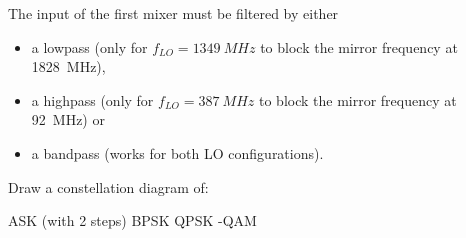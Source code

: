 \begin{solution}
\begin{tasks}
		The input of the first mixer must be filtered by either
		\begin{itemize}
			\item a lowpass (only for $f_{LO} = \SI{1349}{MHz}$ to block the mirror frequency at \SI{1828}{MHz}),
			\item a highpass (only for $f_{LO} = \SI{387}{MHz}$ to block the mirror frequency at \SI{92}{MHz}) or
			\item a bandpass (works for both LO configurations).
		\end{itemize}
	\end{tasks}
\end{solution}

\begin{question}[subtitle={Constellation diagrams}]
	Draw a constellation diagram of:
	\begin{tasks}
		\task
		ASK (with 2 steps)
		\task
		BPSK
		\task
		QPSK
		-QAM
	\end{tasks}
\end{question}

